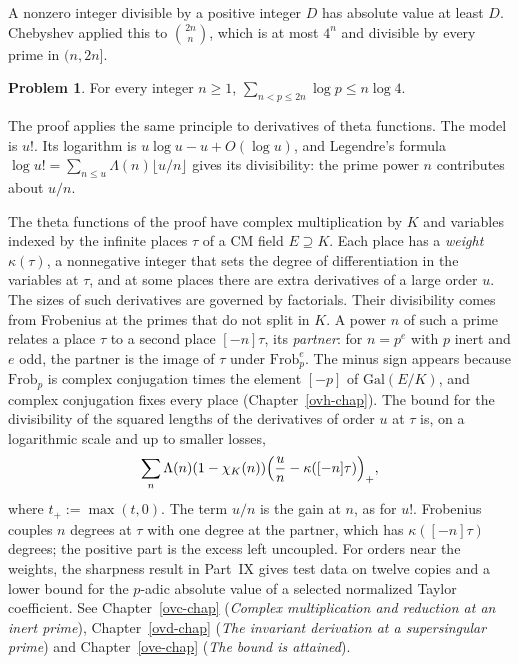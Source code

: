 \documentclass[reqno]{amsart}
\newcounter{chap}
\theoremstyle{definition}
\newtheorem{problem}{Problem}[section]
\begin{document}
A nonzero integer divisible by a positive integer \(D\) has absolute
value at least \(D\).  Chebyshev applied this to \(\binom{2n}{n}\),
which is at most \(4^n\) and divisible by every prime in \((n, 2n]\).

\begin{problem}\label{pr:chebyshev}
  For every integer \(n \ge 1\), \(\sum_{n < p \le 2n} \log p \le n \log 4\).
\end{problem}

The proof applies the same principle to derivatives of theta
functions.  The model is \(u!\).  Its logarithm is
\(u \log u - u + O(\log u)\), and Legendre's formula
\(\log u! = \sum_{n \le u} \Lambda(n) \lfloor u/n \rfloor\) gives its
divisibility: the prime power \(n\) contributes about \(u/n\).

The theta functions of the proof have complex multiplication by
\(K\) and variables indexed by the infinite places \(\tau\) of a CM
field \(E \supseteq K\).  Each place has a \emph{weight}
\(\kappa(\tau)\), a nonnegative integer that sets the degree of
differentiation in the variables at \(\tau\), and at some places there
are extra derivatives of a large order \(u\).  The sizes of such
derivatives are governed by factorials.  Their divisibility comes
from Frobenius at the primes that do not split in \(K\).  A power
\(n\) of such a prime relates a place \(\tau\) to a second place
\([-n]\tau\), its \emph{partner}: for \(n = p^e\) with \(p\) inert
and \(e\) odd, the partner is the image of \(\tau\) under
\(\mathrm{Frob}_p^e\).  The minus sign appears because \(\mathrm{Frob}_p\)
is complex conjugation times the element \([-p]\) of
\(\mathrm{Gal}(E/K)\), and complex conjugation fixes every place
(Chapter~\ref{ovh-chap}).  The bound for the divisibility
of the squared lengths of the derivatives of order \(u\) at \(\tau\)
is, on a logarithmic scale and up to smaller losses,
\[
  \sum_{n} \Lambda(n) (1 - \chi_K(n))
  \Bigl( \frac{u}{n} - \kappa([-n]\tau) \Bigr)_+ ,
\]
where \(t_+ := \max(t, 0)\).  The term \(u/n\) is the gain at \(n\), as for \(u!\).  Frobenius
couples \(n\) degrees at \(\tau\) with one degree at the partner,
which has \(\kappa([-n]\tau)\) degrees; the positive part is the
excess left uncoupled.  For orders near the weights, the sharpness
result in Part~IX gives test data on twelve copies and a lower bound
for the \(p\)-adic absolute value of a selected normalized Taylor
coefficient.  See
Chapter~\ref{ovc-chap} (\emph{Complex multiplication and reduction at an inert prime}),
Chapter~\ref{ovd-chap} (\emph{The invariant derivation at a supersingular prime}) and
Chapter~\ref{ove-chap} (\emph{The bound is attained}).
\end{document}

